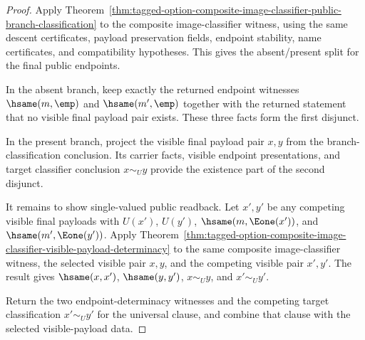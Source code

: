 \begin{proof}
Apply
Theorem~\ref{thm:tagged-option-composite-image-classifier-public-branch-classification}
to the composite image-classifier witness, using the same descent certificates,
payload preservation fields, endpoint stability, name certificates, and
compatibility hypotheses. This gives the absent/present split for the final
public endpoints.

In the absent branch, keep exactly the returned endpoint witnesses
$\hsame(m,\emp)$ and $\hsame(m',\emp)$ together with the returned statement that
no visible final payload pair exists. These three facts form the first
disjunct.

In the present branch, project the visible final payload pair $x,y$ from the
branch-classification conclusion. Its carrier facts, visible endpoint
presentations, and target classifier conclusion $x\sim_U y$ provide the
existence part of the second disjunct.

It remains to show single-valued public readback. Let $x',y'$ be any competing
visible final payloads with $U(x')$, $U(y')$, $\hsame(m,\Eone(x'))$, and
$\hsame(m',\Eone(y'))$. Apply
Theorem~\ref{thm:tagged-option-composite-image-classifier-visible-payload-determinacy}
to the same composite image-classifier witness, the selected visible pair
$x,y$, and the competing visible pair $x',y'$. The result gives
$\hsame(x,x')$, $\hsame(y,y')$, $x\sim_U y$, and $x'\sim_U y'$.

Return the two endpoint-determinacy witnesses and the competing target
classification $x'\sim_U y'$ for the universal clause, and combine that clause
with the selected visible-payload data.
\end{proof}
